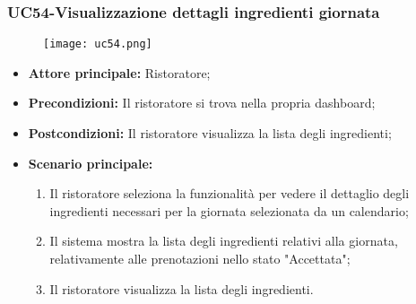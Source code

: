 \subsubsection{UC54-Visualizzazione dettagli ingredienti giornata}
\begin{figure}[h] \texttt{[image: uc54.png]} \end{figure}
\begin{itemize}
\item \textbf{Attore principale:} Ristoratore;
\item \textbf{Precondizioni:} Il ristoratore si trova nella propria dashboard;
\item \textbf{Postcondizioni:} Il ristoratore visualizza la lista degli ingredienti;
\item \textbf{Scenario principale:}
\begin{enumerate}
    \item Il ristoratore seleziona la funzionalità per vedere il dettaglio degli ingredienti necessari per la giornata selezionata da un calendario;
    \item Il sistema mostra la lista degli ingredienti relativi alla giornata, relativamente alle prenotazioni nello stato "Accettata";
    \item Il ristoratore visualizza la lista degli ingredienti.
\end{enumerate}
\end{itemize}

